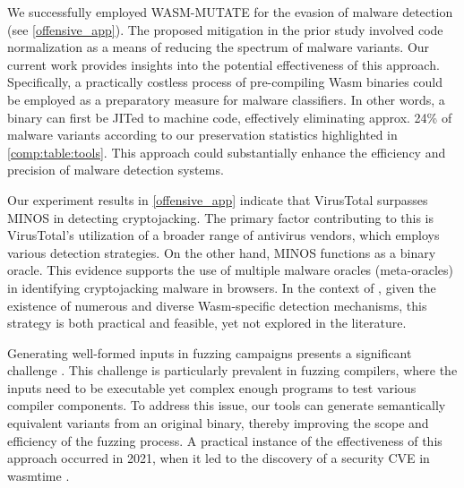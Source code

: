 \begin{strategy}
     We successfully employed WASM-MUTATE for the evasion of malware detection (see \autoref{offensive_app}). 
    The proposed mitigation in the prior study involved code normalization as a means of reducing the spectrum of malware variants. 
    Our current work provides insights into the potential effectiveness of this approach. 
    Specifically, a practically costless process of pre-compiling Wasm binaries could be employed as a preparatory measure for malware classifiers. 
    In other words, a \wasm binary can first be JITed to machine code, effectively eliminating approx. 24\% of malware variants according to our preservation statistics highlighted in \autoref{comp:table:tools}. 
    This approach could substantially enhance the efficiency and precision of malware detection systems.
\end{strategy}

\begin{strategy}
    \label{meta-oracles}
    Our experiment results in \autoref{offensive_app}  indicate that VirusTotal surpasses MINOS in detecting \Wasm cryptojacking. 
    The primary factor contributing to this is VirusTotal's utilization of a broader range of antivirus vendors, which employs various detection strategies. 
    On the other hand, MINOS functions as a binary oracle. 
    This evidence supports the use of multiple malware oracles (meta-oracles) in identifying cryptojacking malware in browsers. 
    In the context of \Wasm, given the existence of numerous and diverse Wasm-specific detection mechanisms, this strategy is both practical and feasible, yet not explored in the literature.
\end{strategy}
    

\begin{strategy}

    Generating well-formed inputs in fuzzing campaigns presents a significant challenge \cite{7958599}. 
    This challenge is particularly prevalent in fuzzing compilers, where the inputs need to be executable yet complex enough programs to test various compiler components. 
    To address this issue, our tools can generate semantically equivalent variants from an original \wasm binary, thereby improving the scope and efficiency of the fuzzing process. 
    A practical instance of the effectiveness of this approach occurred in 2021, when it led to the discovery of a security CVE in wasmtime \cite{CVE}.
    
        
\end{strategy}

